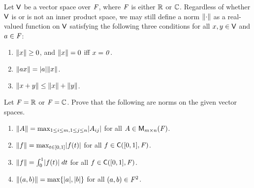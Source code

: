 \begin{defn}\label{6.1.14}
	Let \(\mathsf{V}\) be a vector space over \(\mathit{F}\), where \(\mathit{F}\) is either \(\mathbb{R}\) or \(\mathbb{C}\).
	Regardless of whether \(\mathsf{V}\) is or is not an inner product space, we may still define a norm \(\left\lVert\cdot\right\rVert\) as a real-valued function on \(\mathsf{V}\) satisfying the following three conditions for all \(x, y \in \mathsf{V}\) and \(a \in \mathit{F}\):
	\begin{enumerate}
		\item \(\left\lVert x\right\rVert \geq 0\), and \(\left\lVert x\right\rVert = 0\) iff \(x = \mathit{0}\).
		\item \(\norm{ax} = \abs{a} \norm{x}\).
		\item \(\left\lVert x + y\right\rVert \leq \left\lVert x\right\rVert + \left\lVert y\right\rVert\).
	\end{enumerate}
\end{defn}

\begin{ex}\label{ex:6.1.24}
	Let \(\mathit{F} = \mathbb{R}\) or \(\mathit{F} = \mathbb{C}\).
	Prove that the following are norms on the given vector spaces.
	\begin{enumerate}
		\item \(\norm{A} = \max_{1 \leq i \leq m, 1 \leq j \leq n} \abs{A_{i j}}\) for all \(A \in \ms\).
		\item \(\norm{f} = \max_{t \in [0, 1]} \abs{f(t)}\) for all \(f \in \cfs([0, 1], \F)\).
		\item \(\norm{f} = \int_0^1 \abs{f(t)} \; dt\) for all \(f \in \cfs([0, 1], \F)\).
		\item \(\norm{(a, b)} = \max\set{\abs{a}, \abs{b}}\) for all \((a, b) \in \mathit{F}^2\).
	\end{enumerate}
\end{ex}

